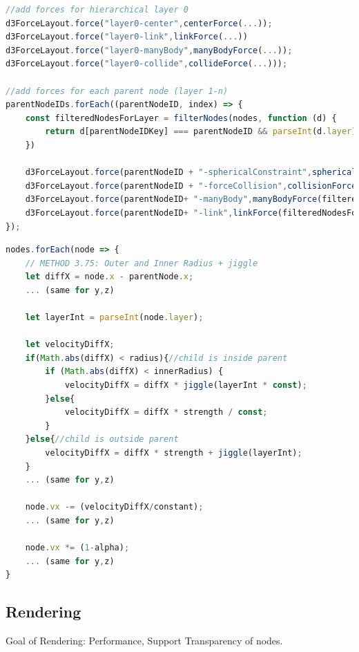 \begin{lstlisting}[language=JavaScript,label={lst:addForces},caption=Simplified algorithm that shows which forces are added to the simulation.] 
//add forces for hierarchical layer 0
d3ForceLayout.force("layer0-center",centerForce(...));
d3ForceLayout.force("layer0-link",linkForce(...))
d3ForceLayout.force("layer0-manyBody",manyBodyForce(...));
d3ForceLayout.force("layer0-collide",collideForce(...)));

//add forces for each parent node (layer 1-n)
parentNodeIDs.forEach((parentNodeID, index) => {
    const filteredNodesForLayer = filterNodes(nodes, function (d) {
        return d[parentNodeIDKey] === parentNodeID && parseInt(d.layer) === childLayer;
    })

    d3ForceLayout.force(parentNodeID + "-sphericalConstraint",sphericalConstraint(filteredNodesForLayer,...));
    d3ForceLayout.force(parentNodeID + "-forceCollision",collisionForce(filteredNodesForLayer,...));
    d3ForceLayout.force(parentNodeID+ "-manyBody",manyBodyForce(filteredNodesForLayer,...));
    d3ForceLayout.force(parentNodeID+ "-link",linkForce(filteredNodesForLayer,...));
});
\end{lstlisting}
\begin{lstlisting}[language=JavaScript,label={lst:sphericalConstraint},caption=Simplified algorithm for the spherical constraint. We apply adapted velocities whenether the child node is inside the parent. In addition we further seperate if the childnode is already inside an closer radius or not.] 
nodes.forEach(node => {
    // METHOD 3.75: Outer and Inner Radius + jiggle
    let diffX = node.x - parentNode.x;
    ... (same for y,z)

    let layerInt = parseInt(node.layer);

    let velocityDiffX;
    if(Math.abs(diffX) < radius){//child is inside parent
        if (Math.abs(diffX) < innerRadius) {
            velocityDiffX = diffX * jiggle(layerInt * const);
        }else{
            velocityDiffX = diffX * strength / const;
        } 
    }else{//child is outside parent
        velocityDiffX = diffX * strength + jiggle(layerInt);
    }
    ... (same for y,z)

    node.vx -= (velocityDiffX/constant);
    ... (same for y,z)

    node.vx *= (1-alpha);
    ... (same for y,z)
}
\end{lstlisting}

\subsection{Rendering}
\label{sec:rendering}
Goal of Rendering: 
Performance, Support Transparency of nodes. 

